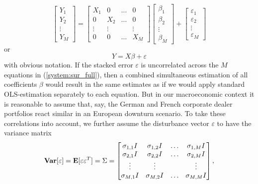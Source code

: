 \documentclass[a4paper, 12pt]{scrreprt}
\newcommand{\ew}{\mbox{\textbf{E}}}
\newcommand{\var}{\mbox{\textbf{Var}}}
\begin{document}
\begin{equation}\label{system:sur_full}
\begin{bmatrix}
Y_1 \\ Y_2 \\ \vdots \\ Y_M
\end{bmatrix}
=
\begin{bmatrix}
X_1    & 0      & \dots  & 0 \\
0      & X_2    & \dots  & 0 \\
\vdots & \vdots &        & \vdots \\
0      & 0      & \dots  & X_M 
\end{bmatrix}
\begin{bmatrix}
\beta_1 \\ \beta_2 \\ \vdots \\ \beta_M
\end{bmatrix}
+
\begin{bmatrix}
\varepsilon_1 \\ \varepsilon_2 \\ \vdots \\ \varepsilon_M
\end{bmatrix}
\end{equation}
or
\begin{equation}\label{system:sur_short}
Y = X \beta + \varepsilon
\end{equation}
with obvious notation. If the stacked error $\varepsilon$ is uncorrelated across the $M$ equations in (\ref{system:sur_full}), then a combined simultaneous estimation of all coefficients $\beta$ would result in the same estimates as if we would apply standard OLS-estimation separately to each equation. But in our macroeconomic context it is reasonable to assume that, say, the German and French corporate dealer portfolios react similar in an European downturn scenario. To take these correlations into account, we further assume the disturbance vector $\varepsilon$ to have the variance matrix
\begin{equation}
\var[\varepsilon] = \ew[\varepsilon \varepsilon^T] = \Sigma = \begin{bmatrix}
\sigma_{1,1}I & \sigma_{1,2}I & \dots & \sigma_{1,M}I \\
\sigma_{2,1}I & \sigma_{2,2}I & \dots & \sigma_{2,M}I \\
\vdots & \vdots & & \vdots \\
\sigma_{M,1}I & \sigma_{M,2}I & \dots & \sigma_{M,M}I 
\end{bmatrix},
\end{equation}
\end{document}
